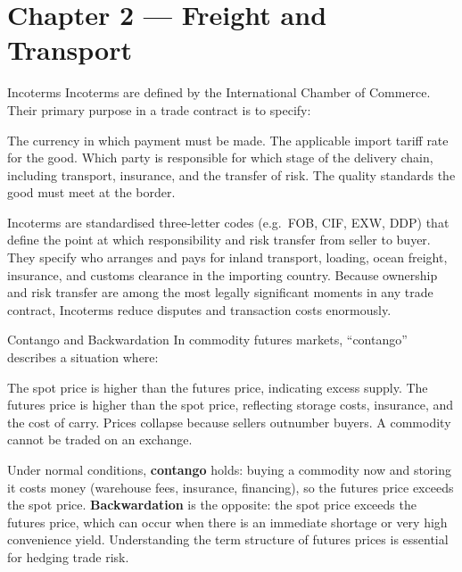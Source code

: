 \documentclass[paper=a5]{scrartcl}
\begin{document}
\section{Chapter 2 — Freight and Transport}

\begin{question}[type=mc]{Incoterms}
Incoterms are defined by the International Chamber of Commerce. Their
primary purpose in a trade contract is to specify:
\begin{choices}
  \choice        The currency in which payment must be made.
  \choice        The applicable import tariff rate for the good.
  \correctchoice Which party is responsible for which stage of the delivery
                 chain, including transport, insurance, and the transfer of
                 risk.
  \choice        The quality standards the good must meet at the border.
\end{choices}
\begin{solution}
  Incoterms are standardised three-letter codes (e.g.\ FOB, CIF, EXW, DDP)
  that define the point at which responsibility and risk transfer from seller
  to buyer. They specify who arranges and pays for inland transport, loading,
  ocean freight, insurance, and customs clearance in the importing country.
  Because ownership and risk transfer are among the most legally significant
  moments in any trade contract, Incoterms reduce disputes and transaction
  costs enormously.
\end{solution}
\end{question}

\begin{question}[type=mc]{Contango and Backwardation}
In commodity futures markets, ``contango'' describes a situation where:
\begin{choices}
  \choice        The spot price is higher than the futures price, indicating
                 excess supply.
  \correctchoice The futures price is higher than the spot price, reflecting
                 storage costs, insurance, and the cost of carry.
  \choice        Prices collapse because sellers outnumber buyers.
  \choice        A commodity cannot be traded on an exchange.
\end{choices}
\begin{solution}
  Under normal conditions, \textbf{contango} holds: buying a commodity now
  and storing it costs money (warehouse fees, insurance, financing), so the
  futures price exceeds the spot price. \textbf{Backwardation} is the
  opposite: the spot price exceeds the futures price, which can occur when
  there is an immediate shortage or very high convenience yield. Understanding
  the term structure of futures prices is essential for hedging trade risk.
\end{solution}
\end{question}
\end{document}
